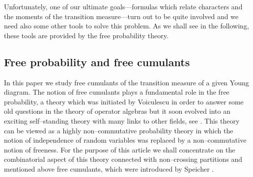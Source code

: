 \documentclass[12pt,dvips]{amsart}
\numberwithin{equation}{section} \numberwithin{figure}{section}
\theoremstyle{plain}
\theoremstyle{definition}
\theoremstyle{remark}
\newcommand{\C}{{\mathbb{C}}}
\newcommand{\Sn}[1]{{{S}}_{#1}}
\begin{document}
Unfortunately, one of our ultimate goals---formulas which relate
characters and the moments of the transition measure---turn out to
be quite involved and we need also some other tools to solve this
problem. As we shall see in the following, these tools are provided
by the free probability theory.






\subsection{Free probability and free cumulants}
\label{subsec:freeproba}

In this paper we study free cumulants of the transition measure of a
given Young diagram. The notion of free cumulants plays a
fundamental role in the free probability, a theory which was
initiated by Voiculescu in order to answer some old questions in the
theory of operator algebras but it soon evolved into an exciting
self--standing theory with many links to other fields, see
\cite{HiaiPetz2000,VoiculescuDykemaNica,VoiculescuPlenar,VoiculescuLectures}.
This theory can be viewed as a highly non--commutative probability
theory in which the notion of independence of random variables was
replaced by a non--commutative notion of freeness.  For the purpose
of this article we shall concentrate on the combinatorial aspect of
this theory connected with non--crossing partitions \cite{Kreweras}
and mentioned above free cumulants, which were introduced by
Speicher \cite{Speicher1994,Speicher1997,Speicher1998}.
\end{document}
